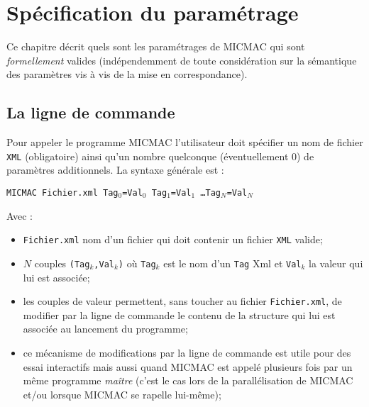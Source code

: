 \chapter{Sp\'ecification du param\'etrage}

Ce chapitre d\'ecrit quels sont les param\'etrages de MICMAC
qui sont \emph{formellement} valides (ind\'ependemment  de
toute consid\'eration sur la s\'emantique des param\`etres
vis \`a vis de la mise en correspondance).


\section{La ligne de commande}

\label{UTIL:SCPECIF:LIGCOM}

Pour appeler le programme MICMAC l'utilisateur doit sp\'ecifier un
nom de fichier {\tt XML}  (obligatoire) ainsi qu'un nombre
quelconque (\'eventuellement $0$) de param\`etres additionnels.
La syntaxe g\'en\'erale  est :

\vspace{0.2cm}
{\tt MICMAC Fichier.xml Tag$_0$=Val$_0$ 
    Tag$_1$=Val$_1$  \dots   Tag$_N$=Val$_N$ }
\vspace{0.2cm}


Avec :

\begin{itemize}
    \item  {\tt Fichier.xml} nom d'un fichier qui doit contenir
      un fichier {\tt XML} valide;
    \item $N$ couples {\tt (Tag$_k$,Val$_k$)} o\`u {\tt Tag$_k$} est
         le nom d'un {\tt Tag} Xml et {\tt Val$_k$} la valeur
          qui lui est associ\'ee; 
     \item les couples de valeur  permettent, sans toucher au fichier
           {\tt Fichier.xml},  de modifier 
          par la ligne de commande le contenu de la  structure qui
          lui est associ\'ee au lancement du programme;
      \item ce m\'ecanisme de modifications par la ligne de commande
            est utile pour des essai interactifs mais aussi quand MICMAC 
            est appel\'e plusieurs fois par un m\^eme programme  
            \emph{ma\^itre} (c'est le cas lors de la parall\'elisation
            de MICMAC et/ou lorsque MICMAC se rapelle lui-m\^eme);
     
\end{itemize}




